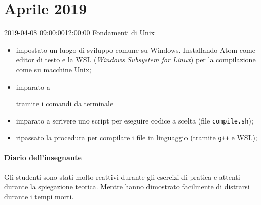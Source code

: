 \documentclass[twoside, symmetric]{tufte-book}
\begin{document}
\section*{Aprile 2019}

\begin{lezione}
	{2019-04-08}
	{09:00:00}{12:00:00}
	{Fondamenti di Unix}

\begin{itemize}
	\item impostato un luogo di sviluppo comune su Windows. Installando Atom come editor di testo e la WSL (\emph{Windows Subsystem for Linux}) per la compilazione come su macchine Unix;
	\item imparato a
	 tramite i comandi da terminale
	\item imparato a scrivere uno script per eseguire codice a scelta (file \texttt{compile.sh});
	\item ripassato la procedura per compilare i file in linguaggio {\Cpp} (tramite \texttt{g++} e WSL);
\end{itemize}

\paragraph{Diario dell'insegnante}
Gli studenti sono stati molto reattivi durante gli esercizi di pratica e attenti durante la spiegazione teorica.
Mentre hanno dimostrato facilmente di distrarsi durante i tempi morti.

%
%

\end{lezione}
\end{document}
